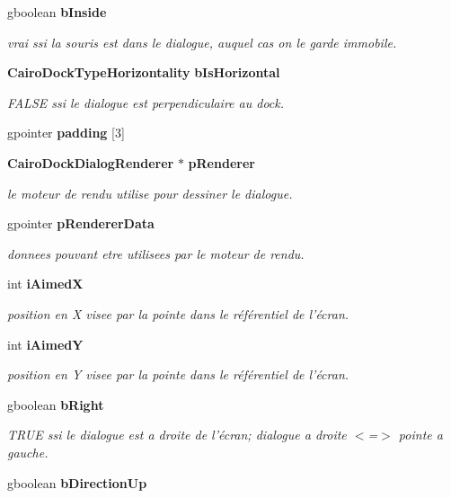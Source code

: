\begin{CompactItemize}
gboolean {\bf bInside}
\begin{CompactList}\small\item\em vrai ssi la souris est dans le dialogue, auquel cas on le garde immobile. \item\end{CompactList}\item 
{\bf CairoDockTypeHorizontality} {\bf bIsHorizontal}
\begin{CompactList}\small\item\em FALSE ssi le dialogue est perpendiculaire au dock. \item\end{CompactList}\item 
gpointer {\bf padding} [3]
\item 
{\bf CairoDockDialogRenderer} $\ast$ {\bf pRenderer}
\begin{CompactList}\small\item\em le moteur de rendu utilise pour dessiner le dialogue. \item\end{CompactList}\item 
gpointer {\bf pRendererData}
\begin{CompactList}\small\item\em donnees pouvant etre utilisees par le moteur de rendu. \item\end{CompactList}\item 
int {\bf iAimedX}
\begin{CompactList}\small\item\em position en X visee par la pointe dans le référentiel de l'écran. \item\end{CompactList}\item 
int {\bf iAimedY}
\begin{CompactList}\small\item\em position en Y visee par la pointe dans le référentiel de l'écran. \item\end{CompactList}\item 
gboolean {\bf bRight}
\begin{CompactList}\small\item\em TRUE ssi le dialogue est a droite de l'écran; dialogue a droite $<$=$>$ pointe a gauche. \item\end{CompactList}\item 
gboolean {\bf bDirectionUp}

\end{CompactItemize}
